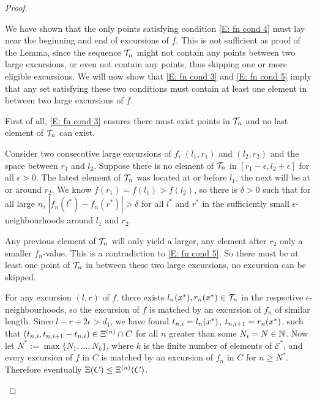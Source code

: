 \begin{proof}
\begin{proofpart}
\bigskip

We have shown that the only points satisfying condition \eqref{E: fn cond 4} must lay near the beginning and end of excursions of $f$.
This is not sufficient as proof of the Lemma, since the sequence $\mathcal{T}_n$ might not contain any points between two large excursions,
or even not contain any points, thus skipping one or more eligible excursions.
We will now show that \eqref{E: fn cond 3} and \eqref{E: fn cond 5} imply 
that any set satisfying these two conditions must contain at least one element in between two large excursions of $f$.

First of all, \eqref{E: fn cond 3} ensures there must exist points in $\mathcal{T}_n$ and no last element of $\mathcal{T}_n$ can exist.

Consider two consecutive large excursions of $f$, $(l_1, r_1)$ and $(l_2, r_2)$
and the space between $r_1$ and $l_2$.
Suppose there is no element of $\mathcal{T}_n$ in $[r_1-\epsilon, l_2+\epsilon]$ for all $\epsilon>0$.
The latest element of $\mathcal{T}_n$ was located at or before $l_1$, the next will be at or around $r_2$.
We know $f(r_1)=f(l_1) > f(l_2)$, so there is $\delta>0$ such that for all large $n$,
$|f_n(l^*) - f_n(r^*)|> \delta$ for all $l^*$ and $r^*$ in the sufficiently small $\epsilon$-neighbourhoods around $l_1$ and $r_2$.

Any previous element of $\mathcal{T}_n$ will only yield a larger, any element after $r_2$ only a smaller $f_n$-value.
This is a contradiction to \eqref{E: fn cond 5}.
So there must be at least one point of $\mathcal{T}_n$ in between these two large excursions, no excursion can be skipped.

\bigskip

For any excursion $(l,r)$ of $f$, there exists $l_n(x^*), r_n(x^*) \in \mathcal{T}_n$ in the respective $\epsilon$-neighbourhoods,
so the excursion of $f$ is matched by an excursion of $f_n$ of similar length.
Since $l - r + 2\epsilon > d_1$,
we have found $t_{n, i} = l_n(x^*)$, $t_{n, i+1} = r_n(x^*)$,
such that $(t_{n, i}, t_{n, i+1} - t_{n, i}) \in \Xi^{(n)} \cap C$
for all $n$ greater than some $N_i = N \in \mathbb{N}$.
Now let $N^* := \max\{N_1, \dots, N_k\}$,
where $k$ is the finite number of elements of $\mathcal{E}^*$,
and every excursion of $f$ in $C$ is matched by an excursion of $f_n$ in $C$
for $n \geq N^*$.
Therefore eventually $\Xi (C) \leq \Xi^{(n)}(C)$.
\end{proofpart}



\end{proof}
